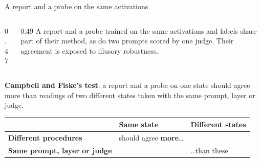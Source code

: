 \documentclass[aspectratio=169,11pt]{beamer}
\begin{document}
\begin{frame}[label=shared]{A report and a probe on the same activations}
\begin{columns}[c]
\begin{column}{0.47\textwidth}
\end{column}
\begin{column}{0.49\textwidth}
{\small A report and a probe trained on the same activations and labels share part of their method, as do two prompts scored by one judge. Their agreement is exposed to illusory robustness.}
\end{column}
\end{columns}

\vspace{0.3em}
{\small \textbf{Campbell and Fiske's test}: a report and a probe on one state should agree more than readings of two different states taken with the same prompt, layer or judge.}

\begin{center}
{\footnotesize\renewcommand{\arraystretch}{1.05}
\begin{tabular}{lll}
\toprule
& \textbf{Same state} & \textbf{Different states} \\
\midrule
\textbf{Different procedures} & should agree \textbf{more}\ldots & \\
\textbf{Same prompt, layer or judge} & & \ldots than these \\
\bottomrule
\end{tabular}}
\end{center}
\end{frame}
\end{document}

